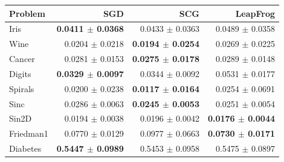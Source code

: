 \begin{tabular}{@{}l rrr@{}}
\toprule
Problem & SGD & SCG & LeapFrog \\
\midrule
Iris & \textbf{0.0411 $\pm$ 0.0368} & 0.0433 $\pm$ 0.0363 & 0.0489 $\pm$ 0.0358 \\
Wine & 0.0204 $\pm$ 0.0218 & \textbf{0.0194 $\pm$ 0.0254} & 0.0269 $\pm$ 0.0225 \\
Cancer & 0.0281 $\pm$ 0.0153 & \textbf{0.0275 $\pm$ 0.0178} & 0.0289 $\pm$ 0.0148 \\
Digits & \textbf{0.0329 $\pm$ 0.0097} & 0.0344 $\pm$ 0.0092 & 0.0531 $\pm$ 0.0177 \\
Spirals & 0.0200 $\pm$ 0.0238 & \textbf{0.0117 $\pm$ 0.0164} & 0.0254 $\pm$ 0.0691 \\
\midrule
Sinc & 0.0286 $\pm$ 0.0063 & \textbf{0.0245 $\pm$ 0.0053} & 0.0251 $\pm$ 0.0054 \\
Sin2D & 0.0194 $\pm$ 0.0038 & 0.0196 $\pm$ 0.0042 & \textbf{0.0176 $\pm$ 0.0044} \\
Friedman1 & 0.0770 $\pm$ 0.0129 & 0.0977 $\pm$ 0.0663 & \textbf{0.0730 $\pm$ 0.0171} \\
Diabetes & \textbf{0.5447 $\pm$ 0.0989} & 0.5453 $\pm$ 0.0958 & 0.5475 $\pm$ 0.0897 \\
\bottomrule
\end{tabular}

